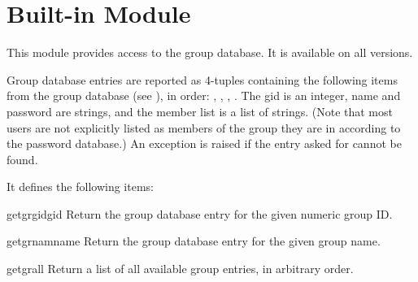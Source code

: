 \section{Built-in Module }
\label{module-grp}

This module provides access to the \UNIX{} group database.
It is available on all \UNIX{} versions.

Group database entries are reported as 4-tuples containing the
following items from the group database (see ), in order:
,
,
,
.
The gid is an integer, name and password are strings, and the member
list is a list of strings.
(Note that most users are not explicitly listed as members of the
group they are in according to the password database.)
An exception is raised if the entry asked for cannot be found.

It defines the following items:

\renewcommand{\indexsubitem}{(in module grp)}
\begin{funcdesc}{getgrgid}{gid}
Return the group database entry for the given numeric group ID.
\end{funcdesc}

\begin{funcdesc}{getgrnam}{name}
Return the group database entry for the given group name.
\end{funcdesc}

\begin{funcdesc}{getgrall}{}
Return a list of all available group entries, in arbitrary order.
\end{funcdesc}
